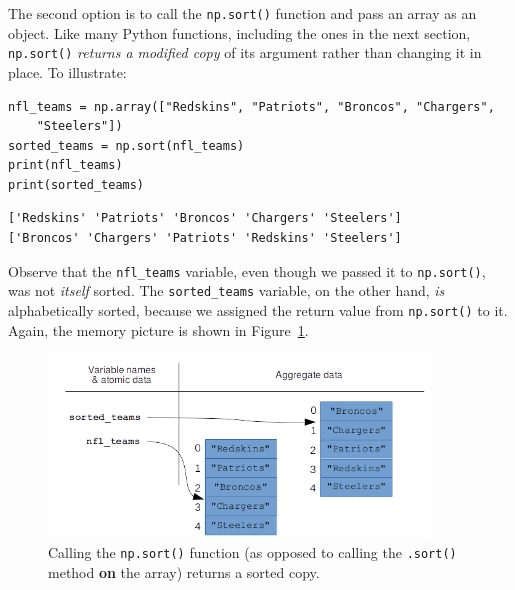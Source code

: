 The second option is to call the \texttt{np.sort()} function and pass an array
as an object. Like many Python functions, including the ones in the next
section, \texttt{np.sort()} \textit{returns a modified copy} of its argument
rather than changing it in place. To illustrate:

\begin{Verbatim}[fontsize=\small,samepage=true,frame=single,framesep=3mm]
nfl_teams = np.array(["Redskins", "Patriots", "Broncos", "Chargers",
    "Steelers"])
sorted_teams = np.sort(nfl_teams)
print(nfl_teams)
print(sorted_teams)
\end{Verbatim}

\begin{Verbatim}[fontsize=\small,samepage=true,frame=leftline,framesep=5mm,framerule=1mm]
['Redskins' 'Patriots' 'Broncos' 'Chargers' 'Steelers']
['Broncos' 'Chargers' 'Patriots' 'Redskins' 'Steelers']
\end{Verbatim}

Observe that the \texttt{nfl\_teams} variable, even though we passed it to
\texttt{np.sort()}, was not \textit{itself} sorted. The \texttt{sorted\_teams}
variable, on the other hand, \textit{is} alphabetically sorted, because we
assigned the return value from \texttt{np.sort()} to it. Again, the memory
picture is shown in Figure~\ref{fig:npSortArray}.

\begin{figure}[ht]
\centering
\includegraphics[width=0.9\textwidth]{npSortArray.png}
\medskip
\caption{Calling the \texttt{np.sort()} function (as opposed to calling the
\texttt{.sort()} method \textbf{on} the array) returns a sorted copy.}
\label{fig:npSortArray}
\end{figure}

